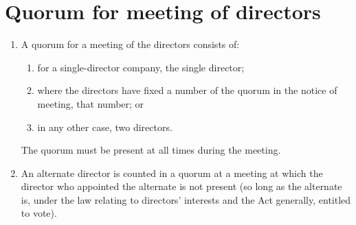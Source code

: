 \section{Quorum for meeting of directors}

\begin{enumerate}[label=(\alph*)]
    \item A quorum for a meeting of the directors consists of:
    \begin{enumerate}[label=(\roman*)]
        \item for a single-director company, the single director;
        \item where the directors have fixed a number of the quorum in the notice of meeting, that number; or
        \item in any other case, two directors.
    \end{enumerate}
    
    The quorum must be present at all times during the meeting.
    
    \item An alternate director is counted in a quorum at a meeting at which the director who appointed the alternate is not present (so long as the alternate is, under the law relating to directors' interests and the Act generally, entitled to vote).
\end{enumerate} 